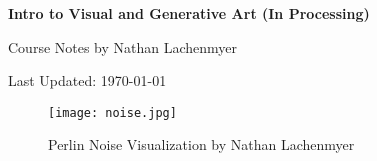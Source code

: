 \documentclass[11pt]{article}
\begin{document}
\centerline{\Large \bf Intro to Visual and Generative Art (In Processing)}
\medskip
\centerline{Course Notes by Nathan Lachenmyer}
\medskip
\centerline{Last Updated: \today}
\bigskip
\begin{figure}[h]
\texttt{[image: noise.jpg]}
\caption{Perlin Noise Visualization by Nathan Lachenmyer}
\end{figure}

\thispagestyle{empty}
\clearpage

\tableofcontents
\clearpage



\clearpage



\clearpage


\clearpage

\end{document}
